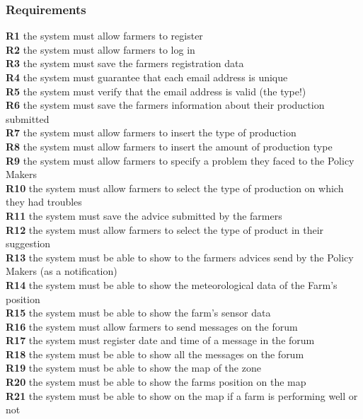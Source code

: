 \documentclass{article}
\begin{document}
\subsubsection{Requirements}
\textbf{R1} the system must allow farmers to register\\
\textbf{R2} the system must allow farmers to log in\\
\textbf{R3} the system must save the farmers registration data\\
\textbf{R4} the system must guarantee that each email address is unique\\
\textbf{R5} the system must verify that the email address is valid (the type!)\\
\textbf{R6} the system must save the farmers information about their production submitted\\
\textbf{R7} the system must allow farmers to insert the type of production \\
\textbf{R8} the system must allow farmers to insert the amount of production type\\
\textbf{R9} the system must allow farmers to specify a problem they faced to the Policy Makers\\
\textbf{R10} the system must allow farmers to select the type of production on which they had troubles\\
\textbf{R11} the system must save the advice submitted by the farmers\\
\textbf{R12} the system must allow farmers to select the type of product in their suggestion\\
\textbf{R13} the system must be able to show to the farmers advices send by the Policy Makers (as a notification)\\
\textbf{R14} the system must be able to show the meteorological data of the Farm’s position\\
\textbf{R15} the system must be able to show the farm’s sensor data \\
\textbf{R16} the system must allow farmers to send messages on the forum\\
\textbf{R17} the system must register date and time of a message in the forum\\
\textbf{R18} the system must be able to show all the messages on the forum\\
\textbf{R19} the system must be able to show the map of the zone\\
\textbf{R20} the system must be able to show the farms position on the map\\
\textbf{R21} the system must be able to show on the map if a farm is performing well or not \\
\end{document}
